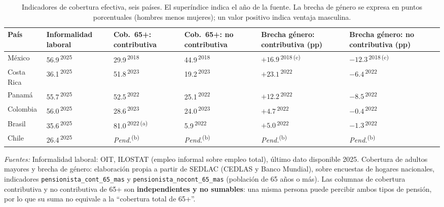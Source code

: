 \documentclass[12pt, letterpaper]{article}
\begin{document}
\begin{table}[h!]
\centering
\caption{Indicadores de cobertura efectiva, seis países. El superíndice indica el año de la fuente. La brecha de género se expresa en puntos porcentuales (hombres menos mujeres); un valor positivo indica ventaja masculina.}
\label{tab:cobertura}
\scriptsize
\begin{tabularx}{\textwidth}{P{1.55cm}YYYYY}
\toprule
País & Informalidad laboral & Cob.\ 65+: contributiva & Cob.\ 65+: no contributiva & Brecha género: contributiva (pp) & Brecha género: no contributiva (pp) \\
\midrule
México &
56.9\,\textsuperscript{2025} &
29.9\,\textsuperscript{2018} &
44.9\,\textsuperscript{2018} &
$+16.9$\,\textsuperscript{2018\,(c)} &
$-12.3$\,\textsuperscript{2018\,(c)} \\

Costa Rica &
36.1\,\textsuperscript{2025} &
51.8\,\textsuperscript{2023} &
19.2\,\textsuperscript{2023} &
$+23.1$\,\textsuperscript{2022} &
$-6.4$\,\textsuperscript{2022} \\

Panamá &
55.7\,\textsuperscript{2025} &
52.5\,\textsuperscript{2022} &
25.1\,\textsuperscript{2022} &
$+12.2$\,\textsuperscript{2022} &
$-8.5$\,\textsuperscript{2022} \\

Colombia &
56.0\,\textsuperscript{2025} &
28.6\,\textsuperscript{2023} &
24.0\,\textsuperscript{2023} &
$+4.7$\,\textsuperscript{2022} &
$-0.4$\,\textsuperscript{2022} \\

Brasil &
35.6\,\textsuperscript{2025} &
81.0\,\textsuperscript{2022\,(a)} &
5.9\,\textsuperscript{2022} &
$+5.0$\,\textsuperscript{2022} &
$-1.3$\,\textsuperscript{2022} \\

Chile &
26.4\,\textsuperscript{2025} &
\textit{Pend.}\textsuperscript{(b)} &
\textit{Pend.}\textsuperscript{(b)} &
\textit{Pend.}\textsuperscript{(b)} &
\textit{Pend.}\textsuperscript{(b)} \\
\bottomrule
\end{tabularx}

\smallskip
\footnotesize
\textit{Fuentes:} Informalidad laboral: OIT, ILOSTAT (empleo informal sobre empleo total), último dato disponible 2025. Cobertura de adultos mayores y brecha de género: elaboración propia a partir de SEDLAC (CEDLAS y Banco Mundial), sobre encuestas de hogares nacionales, indicadores \texttt{pensionista\_cont\_65\_mas} y \texttt{pensionista\_nocont\_65\_mas} (población de 65 años o más). Las columnas de cobertura contributiva y no contributiva de 65+ son \textbf{independientes y no sumables}: una misma persona puede percibir ambos tipos de pensión, por lo que su suma no equivale a la ``cobertura total de 65+''.


\end{table}
\end{document}
